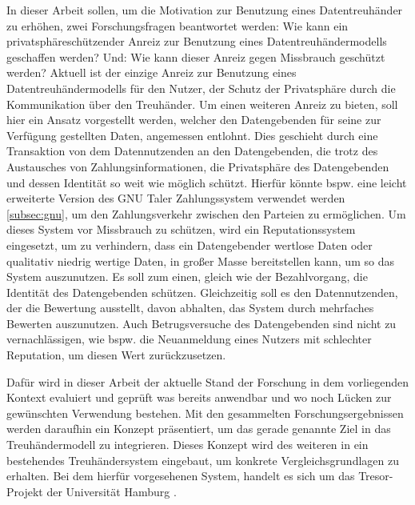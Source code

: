 \documentclass[11pt,a4paper]{scrreprt}
\begin{document}
In dieser Arbeit sollen, um die Motivation zur Benutzung eines Datentreuhänder zu erhöhen, zwei Forschungsfragen beantwortet werden: Wie kann ein privatsphäreschützender Anreiz zur Benutzung eines Datentreuhändermodells geschaffen werden? Und: Wie kann dieser Anreiz gegen Missbrauch geschützt werden? Aktuell ist der einzige Anreiz zur Benutzung eines Datentreuhändermodells für den Nutzer, der Schutz der Privatsphäre durch die Kommunikation über den Treuhänder. Um einen weiteren Anreiz zu bieten, soll hier ein Ansatz vorgestellt werden, welcher den Datengebenden für seine zur Verfügung gestellten Daten, angemessen entlohnt. Dies geschieht durch eine Transaktion von dem Datennutzenden an den Datengebenden, die trotz des Austausches von Zahlungsinformationen, die Privatsphäre des Datengebenden und dessen Identität so weit wie möglich schützt. Hierfür könnte bspw. eine leicht erweiterte Version des GNU Taler Zahlungssystem verwendet werden \ref{subsec:gnu}, um den Zahlungsverkehr zwischen den Parteien zu ermöglichen. Um dieses System vor Missbrauch zu schützen, wird ein Reputationssystem eingesetzt, um zu verhindern, dass ein Datengebender wertlose Daten oder qualitativ niedrig wertige Daten, in großer Masse bereitstellen kann, um so das System auszunutzen. Es soll zum einen, gleich wie der Bezahlvorgang, die Identität des Datengebenden schützen. Gleichzeitig soll es den Datennutzenden, der die Bewertung ausstellt, davon abhalten, das System durch mehrfaches Bewerten auszunutzen. Auch Betrugsversuche des Datengebenden sind nicht zu vernachlässigen, wie bspw. die Neuanmeldung eines Nutzers mit schlechter Reputation, um diesen Wert zurückzusetzen.

Dafür wird in dieser Arbeit der aktuelle Stand der Forschung in dem vorliegenden Kontext evaluiert und geprüft was bereits anwendbar und wo noch Lücken zur gewünschten Verwendung bestehen. Mit den gesammelten Forschungsergebnissen werden daraufhin ein Konzept präsentiert, um das gerade genannte Ziel in das Treuhändermodell zu integrieren. Dieses Konzept wird des weiteren in ein bestehendes Treuhändersystem eingebaut, um konkrete Vergleichsgrundlagen zu erhalten. Bei dem hierfür vorgesehenen System, handelt es sich um das Tresor-Projekt der Universität Hamburg \cite{TRESOR}.


\end{document}
